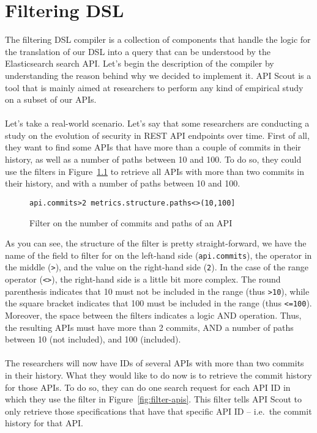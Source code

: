 \chapter{Filtering DSL}\label{ch:filtering-dsl}
The filtering DSL compiler is a collection of components that handle the logic for the translation of our DSL into a query that can be understood by the Elasticsearch search API\@.
Let's begin the description of the compiler by understanding the reason behind why we decided to implement it.
API Scout is a tool that is mainly aimed at researchers to perform any kind of empirical study on a subset of our APIs. \\ \\
Let's take a real-world scenario.
Let's say that some researchers are conducting a study on the evolution of security in REST API endpoints over time.
First of all, they want to find some APIs that have more than a couple of commits in their history, as well as a number of paths between 10 and 100.
To do so, they could use the filters in Figure~\ref{fig:filter-commits} to retrieve all APIs with more than two commits in their history, and with a number of paths between 10 and 100.

\begin{figure}[!h]
    \begin{center}
        \verb|api.commits>2 metrics.structure.paths<>(10,100]|
    \end{center}

    \caption{Filter on the number of commits and paths of an API}
    \label{fig:filter-commits}
\end{figure}

\noindent As you can see, the structure of the filter is pretty straight-forward, we have the name of the field to filter for on the left-hand side (\verb|api.commits|), the operator in the middle (\verb|>|), and the value on the right-hand side (\verb|2|).
In the case of the range operator (\verb|<>|), the right-hand side is a little bit more complex.
The round parenthesis indicates that 10 must not be included in the range (thus \verb|>10|), while the square bracket indicates that 100 must be included in the range (thus \verb|<=100|).
Moreover, the space between the filters indicates a logic AND operation.
Thus, the resulting APIs must have more than 2 commits, AND a number of paths between 10 (not included), and 100 (included). \\ \\
The researchers will now have IDs of several APIs with more than two commits in their history.
What they would like to do now is to retrieve the commit history for those APIs.
To do so, they can do one search request for each API ID in which they use the filter in Figure~\ref{fig:filter-apis}.
This filter tells API Scout to only retrieve those specifications that have that specific API ID -- i.e.\ the commit history for that API\@.

